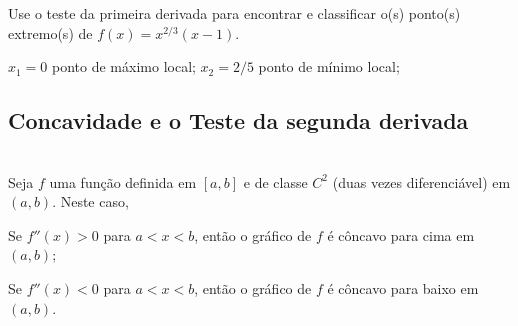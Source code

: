 \cleardoublepage\documentclass[../main.tex]{subfiles}
\begin{document}
\begin{exer}
  Use o teste da primeira derivada para encontrar e classificar o(s) ponto(s) extremo(s) de $\displaystyle f(x) = x^{2/3}(x-1)$.
\end{exer}
\begin{resp}
  $x_1=0$ ponto de máximo local; $x_2=2/5$ ponto de mínimo local;
\end{resp}
\subsection{Concavidade e o Teste da segunda derivada}\label{sec:testeSegDeriv}

\begin{framed}
\begin{teo}~
\\ Seja $f$ uma função definida em $[a,b]$ e de classe $C^2$ (duas vezes diferenciável) em $(a,b)$. Neste caso, 
\begin{compactenum}[(a)]
\item Se $f''(x)>0$  para $a<x<b$, então o gráfico de $f$ é côncavo para cima em $(a,b)$; 
\item Se $f''(x)<0$  para $a<x<b$, então o gráfico de $f$ é côncavo para baixo em $(a,b)$. 
\end{compactenum}

\end{teo}
\end{framed}
\end{document}
